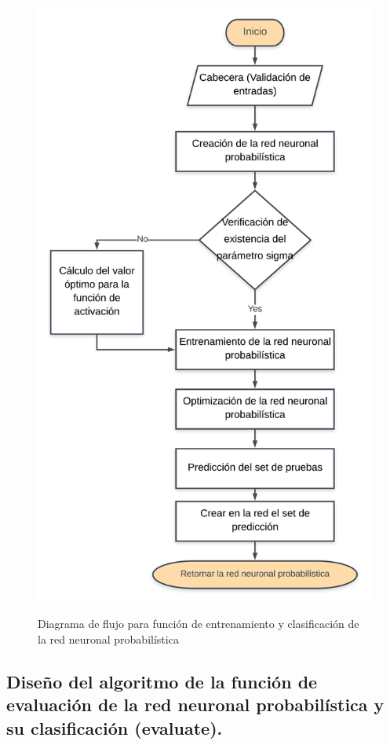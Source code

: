 \begin{figure}[h!]
	\caption{Diagrama de flujo para función de entrenamiento y clasificación de la red neuronal probabilística}
	\centering
	\includegraphics[scale=0.18]{trainNeuralNet.png}
	\label{fig:trainNeuralNet}
\end{figure}

\subsection{Diseño del algoritmo de la función de evaluación de la red neuronal probabilística y su clasificación (evaluate).}

